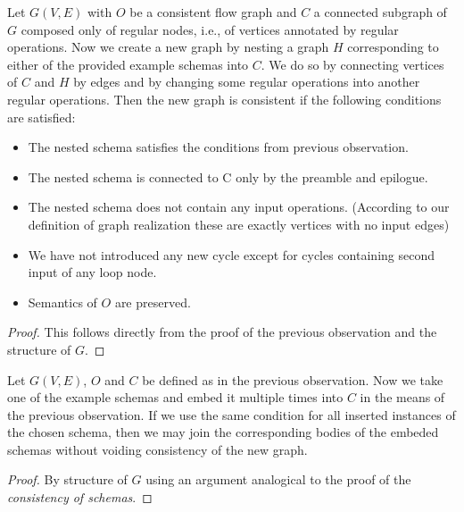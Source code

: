 \begin{observation}
  Let $G(V,E)$ with $O$ be a consistent flow graph and $C$ a connected subgraph of $G$ composed only of regular nodes, i.e., of vertices annotated by regular operations. Now we create a new graph by nesting a graph $H$ corresponding to either of the provided example schemas into $C$. We do so by connecting vertices of $C$ and $H$ by edges and by changing some regular operations into another regular operations. Then the new graph is consistent if the following conditions are satisfied:
  \begin{itemize}
    \item The nested schema satisfies the conditions from previous observation.
    \item The nested schema is connected to C only by the preamble and epilogue.
    \item The nested schema does not contain any input operations. (According to our definition of graph realization these are exactly vertices with no input edges)
    \item We have not introduced any new cycle except for cycles containing second input of any loop node.
    \item Semantics of $O$ are preserved.
  \end{itemize}
  \begin{proof} 
    This follows directly from the proof of the previous observation and the structure of $G$.
  \end{proof}
\end{observation}

\begin{observation}
  Let $G(V,E)$, $O$ and $C$ be defined as in the previous observation. Now we take one of the example schemas and embed it multiple times into $C$ in the means of the previous observation. If we use the same condition for all inserted instances of the chosen schema, then we may join the corresponding bodies of the embeded schemas without voiding consistency of the new graph.
  \begin{proof} 
    By structure of $G$ using an argument analogical to the proof of the \emph{consistency of schemas}.
  \end{proof}
\end{observation}



